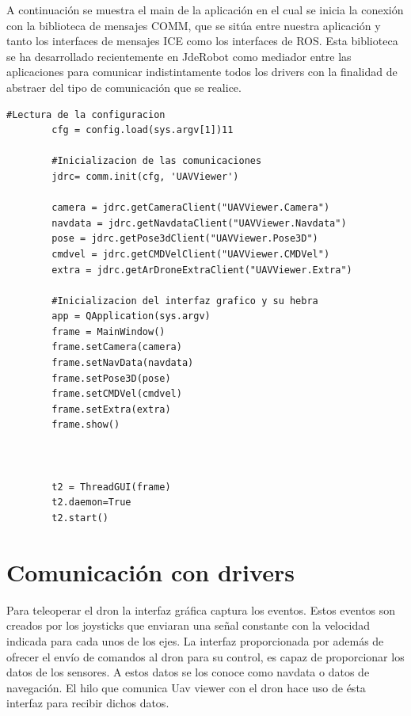 A continuación se muestra el main de la aplicación en el cual se inicia la conexión con la biblioteca de mensajes COMM, que se sitúa entre nuestra aplicación y tanto los interfaces de mensajes ICE como los interfaces de ROS. Esta biblioteca se ha desarrollado recientemente en JdeRobot como mediador entre las aplicaciones para comunicar indistintamente todos los drivers con la finalidad de abstraer del tipo de comunicación que se realice.

\begin{lstlisting}[frame=single]
		#Lectura de la configuracion
        cfg = config.load(sys.argv[1])11

        #Inicializacion de las comunicaciones
        jdrc= comm.init(cfg, 'UAVViewer')

        camera = jdrc.getCameraClient("UAVViewer.Camera")
        navdata = jdrc.getNavdataClient("UAVViewer.Navdata")
        pose = jdrc.getPose3dClient("UAVViewer.Pose3D")
        cmdvel = jdrc.getCMDVelClient("UAVViewer.CMDVel")
        extra = jdrc.getArDroneExtraClient("UAVViewer.Extra")

		#Inicializacion del interfaz grafico y su hebra
        app = QApplication(sys.argv)
        frame = MainWindow()
        frame.setCamera(camera)
        frame.setNavData(navdata)
        frame.setPose3D(pose)
        frame.setCMDVel(cmdvel)
        frame.setExtra(extra)
        frame.show()



        t2 = ThreadGUI(frame)
        t2.daemon=True
        t2.start()
\end{lstlisting}

\section{Comunicación con drivers} 

Para teleoperar el dron la interfaz gráfica captura los eventos. Estos eventos son creados por los joysticks que enviaran una señal constante con la velocidad indicada para cada unos de los ejes. La interfaz proporcionada por además de ofrecer el envío de comandos al dron para su control, es capaz de proporcionar los datos de los sensores. A estos datos se los conoce como navdata o datos de navegación. El hilo que comunica Uav viewer con el dron hace uso de ésta interfaz para recibir dichos datos. 

